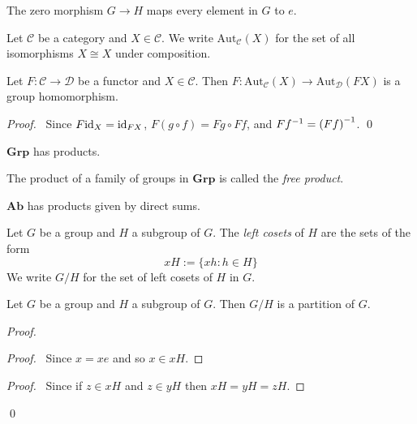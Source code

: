 The zero morphism $G \rightarrow H$ maps every element in $G$ to $e$.

\begin{df}
Let $\mathcal{C}$ be a category and $X \in \mathcal{C}$. We write $\mathrm{Aut}_\mathcal{C}(X)$ for the set of all isomorphisms $X \cong X$ under composition.
\end{df}

\begin{prop}
Let $F : \mathcal{C} \rightarrow \mathcal{D}$ be a functor and $X \in \mathcal{C}$. Then $F : \mathrm{Aut}_\mathcal{C}(X) \rightarrow \mathrm{Aut}_\mathcal{D}(FX)$ is a group homomorphism.
\end{prop}

\begin{proof}
\pf\ Since $F \mathrm{id}_{X} = \mathrm{id}_{FX}$, $F(g \circ f) = Fg \circ Ff$, and $F {f}^{-1} = {(Ff)}^{-1}$. \qed
\end{proof}

\begin{prop}
$\mathbf{Grp}$ has products.
\end{prop}

\begin{df}
The product of a family of groups in $\mathbf{Grp}$ is called the \emph{free product}.
\end{df}

\begin{prop}
$\mathbf{Ab}$ has products given by direct sums.
\end{prop}

\begin{df}
Let $G$ be a group and $H$ a subgroup of $G$. The \emph{left cosets} of $H$ are the sets of the form
\[ xH := \{ xh : h \in H \} \]
We write $G/H$ for the set of left cosets of $H$ in $G$.
\end{df}

\begin{prop}
Let $G$ be a group and $H$ a subgroup of $G$. Then $G/H$ is a partition of $G$.
\end{prop}

\begin{proof}
\pf
{}
\begin{proof}
	\pf\ Since $x = xe$ and so $x \in xH$.
\end{proof}
\begin{proof}
	\pf\ Since if $z \in xH$ and $z \in yH$ then $xH = yH = zH$.
\end{proof}
\qed
\end{proof}

